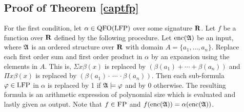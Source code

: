 

\subsection{Proof of Theorem \ref{captfp}}

For the first condition, let $\alpha\in{\rm QFO}({\rm LFP})$ over some signature $\mathbf{R}$. Let $f$ be a function over $\mathbf{R}$ defined by the following procedure. Let ${\rm enc}(\mathfrak{A})$ be an input, where $\mathfrak{A}$ is an ordered structure over $\mathbf{R}$ with domain $A = \{a_1,\ldots,a_n\}$. Replace each first order sum and first order product in $\alpha$ by an expansion using the elements in $A$. This is, $\Sigma x \beta(x)$ is replaced by $(\beta(a_1)+\cdots+\beta(a_n))$ and $\Pi x \beta(x)$ is replaced by $(\beta(a_1)\cdot\,\cdots\,\cdot\beta(a_n))$. Then each sub-formula $\varphi\in{\rm LFP}$ in $\alpha$ is replaced by 1 if $\mathfrak{A}\models\varphi$ and by 0 otherwise. The resulting formula is an arithmetic expression of polynomial size which is evaluated and lastly given as output. Note that $f\in\text{\sc FP}$ and $f({\rm enc}(\mathfrak{A})) = \alpha({\rm enc}(\mathfrak{A}))$.
	
